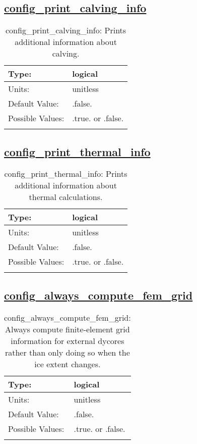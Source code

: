 \subsection[config\_print\_calving\_info]{\hyperref[sec:nm_tab_debug]{config\_print\_calving\_info}}
\label{subsec:nm_sec_config_print_calving_info}
\begin{center}
\begin{longtable}{| p{2.0in} || p{4.0in} |}
    \hline
    Type: & logical \\
    \hline
    Units: & \si{unitless} \\
    \hline
    Default Value: & .false. \\
    \hline
    Possible Values: & .true. or .false. \\
    \hline
    \caption{config\_print\_calving\_info: Prints additional information about calving.}
\end{longtable}
\end{center}
\subsection[config\_print\_thermal\_info]{\hyperref[sec:nm_tab_debug]{config\_print\_thermal\_info}}
\label{subsec:nm_sec_config_print_thermal_info}
\begin{center}
\begin{longtable}{| p{2.0in} || p{4.0in} |}
    \hline
    Type: & logical \\
    \hline
    Units: & \si{unitless} \\
    \hline
    Default Value: & .false. \\
    \hline
    Possible Values: & .true. or .false. \\
    \hline
    \caption{config\_print\_thermal\_info: Prints additional information about thermal calculations.}
\end{longtable}
\end{center}
\subsection[config\_always\_compute\_fem\_grid]{\hyperref[sec:nm_tab_debug]{config\_always\_compute\_fem\_grid}}
\label{subsec:nm_sec_config_always_compute_fem_grid}
\begin{center}
\begin{longtable}{| p{2.0in} || p{4.0in} |}
    \hline
    Type: & logical \\
    \hline
    Units: & \si{unitless} \\
    \hline
    Default Value: & .false. \\
    \hline
    Possible Values: & .true. or .false. \\
    \hline
    \caption{config\_always\_compute\_fem\_grid: Always compute finite-element grid information for external dycores rather than only doing so when the ice extent changes.}
\end{longtable}
\end{center}
